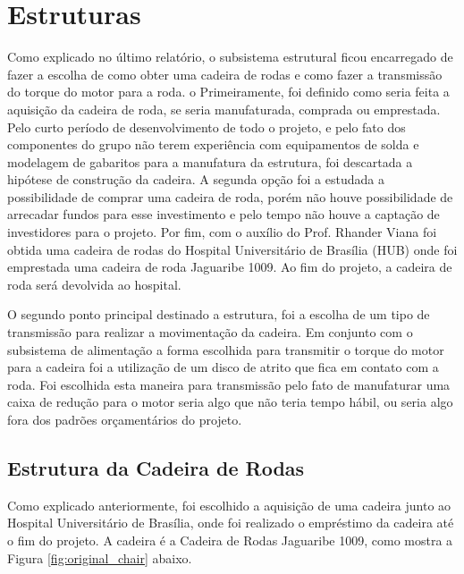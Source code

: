 \section{Estruturas}

Como explicado no último relatório, o subsistema estrutural ficou encarregado
de fazer a escolha de como obter uma cadeira de rodas e como fazer a
transmissão do torque do motor para a roda.
o
Primeiramente, foi definido como seria feita a aquisição da cadeira de roda, se
seria manufaturada, comprada ou emprestada. Pelo curto período de
desenvolvimento de todo o projeto, e pelo fato dos componentes do grupo não
terem experiência com equipamentos de solda e modelagem de gabaritos para a
manufatura da estrutura, foi descartada a hipótese de construção da cadeira.
A segunda opção foi a estudada a possibilidade de comprar uma cadeira de roda,
porém não houve possibilidade de arrecadar fundos para esse investimento e pelo
tempo não houve a captação de investidores para o projeto. Por fim, com o
auxílio do Prof. Rhander Viana foi obtida uma cadeira de rodas do Hospital
Universitário de Brasília (HUB) onde foi emprestada uma cadeira de roda
Jaguaribe 1009. Ao fim do projeto, a cadeira de roda será devolvida ao hospital.

O segundo ponto principal destinado a estrutura, foi a escolha de um tipo de
transmissão para realizar a movimentação da cadeira. Em conjunto com o
subsistema de alimentação a forma escolhida para transmitir o torque do motor
para a cadeira foi a utilização de um disco de atrito que fica em contato com a
roda. Foi escolhida esta maneira para transmissão pelo fato de manufaturar uma
caixa de redução para o motor seria algo que não teria tempo hábil, ou seria
algo fora dos padrões orçamentários do projeto.

\subsection{Estrutura da Cadeira de Rodas}

Como explicado anteriormente, foi escolhido a aquisição de uma cadeira junto ao
Hospital Universitário de Brasília, onde foi realizado o empréstimo da cadeira
até o fim do projeto. A cadeira é a Cadeira de Rodas Jaguaribe 1009, como mostra
 a Figura \ref{fig:original_chair} abaixo.

